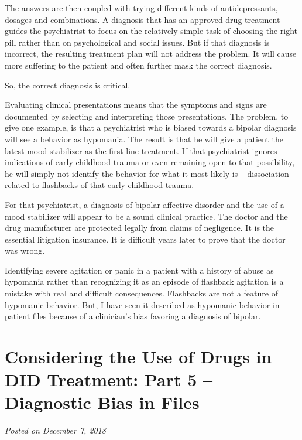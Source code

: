 \documentclass[]{book}
\begin{document}
The answers are then coupled with trying different kinds of antidepressants, dosages and combinations. A diagnosis that has an approved drug treatment guides the psychiatrist to focus on the relatively simple task of choosing the right pill rather than on psychological and social issues. But if that diagnosis is incorrect, the resulting treatment plan will not address the problem. It will cause more suffering to the patient and often further mask the correct diagnosis.

So, the correct diagnosis is critical.

Evaluating clinical presentations means that the symptoms and signs are documented by selecting and interpreting those presentations. The problem, to give one example, is that a psychiatrist who is biased towards a bipolar diagnosis will see a behavior as hypomania. The result is that he will give a patient the latest mood stabilizer as the first line treatment. If that psychiatrist ignores indications of early childhood trauma or even remaining open to that possibility, he will simply not identify the behavior for what it most likely is -- dissociation related to flashbacks of that early childhood trauma.

For that psychiatrist, a diagnosis of bipolar affective disorder and the use of a mood stabilizer will appear to be a sound clinical practice. The doctor and the drug manufacturer are protected legally from claims of negligence. It is the essential litigation insurance. It is difficult years later to prove that the doctor was wrong.

Identifying severe agitation or panic in a patient with a history of abuse as hypomania rather than recognizing it as an episode of flashback agitation is a mistake with real and difficult consequences. Flashbacks are not a feature of hypomanic behavior. But, I have seen it described as hypomanic behavior in patient files because of a clinician's bias favoring a diagnosis of bipolar.

\hypertarget{considering-the-use-of-drugs-in-did-treatment-part-5-diagnostic-bias-in-files}{%
\section{Considering the Use of Drugs in DID Treatment: Part 5 -- Diagnostic Bias in Files}\label{considering-the-use-of-drugs-in-did-treatment-part-5-diagnostic-bias-in-files}}

\emph{Posted on December 7, 2018}
\end{document}
